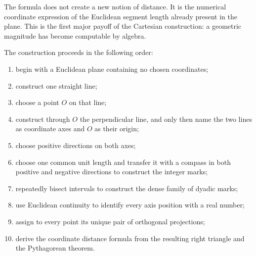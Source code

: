 \begin{interpretationbox}
The formula does not create a new notion of distance. It is the numerical
coordinate expression of the Euclidean segment length already present in the
plane. This is the first major payoff of the Cartesian construction: a geometric
magnitude has become computable by algebra.
\end{interpretationbox}

\begin{summarybox}
The construction proceeds in the following order:
\begin{enumerate}
    \item begin with a Euclidean plane containing no chosen coordinates;
    \item construct one straight line;
    \item choose a point $O$ on that line;
    \item construct through $O$ the perpendicular line, and only then name the
          two lines as coordinate axes and $O$ as their origin;
    \item choose positive directions on both axes;
    \item choose one common unit length and transfer it with a compass in both
          positive and negative directions to construct the integer marks;
    \item repeatedly bisect intervals to construct the dense family of dyadic
          marks;
    \item use Euclidean continuity to identify every axis position with a real
          number;
    \item assign to every point its unique pair of orthogonal projections;
    \item derive the coordinate distance formula from the resulting right
          triangle and the Pythagorean theorem.
\end{enumerate}
\end{summarybox}
